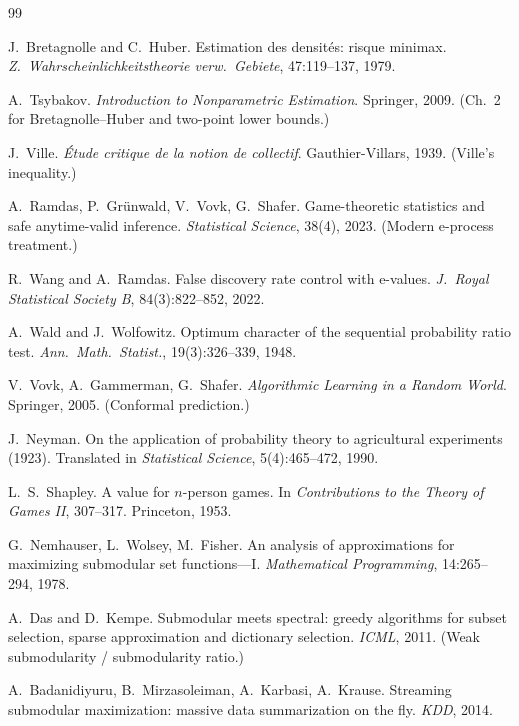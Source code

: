 \documentclass[11pt]{article}
\theoremstyle{plain}
\theoremstyle{definition}
\theoremstyle{remark}
\begin{document}
\begin{thebibliography}{99}\small

 J.~Bretagnolle and C.~Huber.
Estimation des densit\'es: risque minimax.
\emph{Z.\ Wahrscheinlichkeitstheorie verw.\ Gebiete}, 47:119--137, 1979.

 A.~Tsybakov.
\emph{Introduction to Nonparametric Estimation}. Springer, 2009. (Ch.~2 for
Bretagnolle--Huber and two-point lower bounds.)

 J.~Ville.
\emph{\'Etude critique de la notion de collectif}. Gauthier-Villars, 1939.
(Ville's inequality.)

 A.~Ramdas, P.~Gr\"unwald, V.~Vovk, G.~Shafer.
Game-theoretic statistics and safe anytime-valid inference.
\emph{Statistical Science}, 38(4), 2023. (Modern e-process treatment.)

 R.~Wang and A.~Ramdas.
False discovery rate control with e-values.
\emph{J.\ Royal Statistical Society B}, 84(3):822--852, 2022.

 A.~Wald and J.~Wolfowitz.
Optimum character of the sequential probability ratio test.
\emph{Ann.\ Math.\ Statist.}, 19(3):326--339, 1948.

 V.~Vovk, A.~Gammerman, G.~Shafer.
\emph{Algorithmic Learning in a Random World}. Springer, 2005. (Conformal
prediction.)

 J.~Neyman.
On the application of probability theory to agricultural experiments (1923).
Translated in \emph{Statistical Science}, 5(4):465--472, 1990.

 L.~S.~Shapley.
A value for $n$-person games. In \emph{Contributions to the Theory of Games
II}, 307--317. Princeton, 1953.

 G.~Nemhauser, L.~Wolsey, M.~Fisher.
An analysis of approximations for maximizing submodular set functions---I.
\emph{Mathematical Programming}, 14:265--294, 1978.

 A.~Das and D.~Kempe.
Submodular meets spectral: greedy algorithms for subset selection, sparse
approximation and dictionary selection. \emph{ICML}, 2011. (Weak
submodularity / submodularity ratio.)

 A.~Badanidiyuru, B.~Mirzasoleiman, A.~Karbasi, A.~Krause.
Streaming submodular maximization: massive data summarization on the fly.
\emph{KDD}, 2014.


\end{thebibliography}
\end{document}
